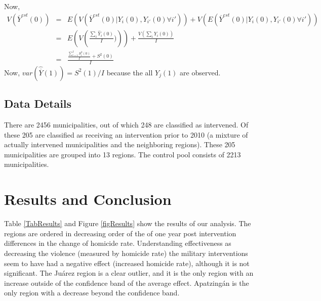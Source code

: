 \documentclass{article}[11 pt]
\begin{document}


Now, \begin{eqnarray*}
  V(\overline{Y}^{est}(0))&=&E(V(\overline{Y}^{est}(0)|Y_i(0),Y_{i'}(0) \forall i'))+ 			V(E(\overline{Y}^{est}(0)|Y_i(0),Y_{i'}(0)\forall i'))\\
  &=&E\left(V\left(\frac{\sum_i \hat{Y}_i(0)}{I})\right)\right)+\frac{V(\sum_iY_i(0))}{I}\\
&=&\frac{\frac{\sum_{i=1}^I S^2_i(0)}{I}+S^2(0)}{I}
\end{eqnarray*}
Now, $var(\hat{\overline{Y}}(1)) = S^2(1)/I$ because the all $Y_j(1)$ are observed.	

\subsection{Data Details}
There are 2456 municipalities, out of which 248 are classified as intervened. Of these 205 are classified as receiving an intervention prior to 2010 (a mixture of actually intervened municipalities and the neighboring regions). These 205 municipalities are grouped into 13 regions. The control pool consists of 2213 municipalities. 
			
\section{Results and Conclusion}
Table \ref{TabResults} and Figure \ref{figResults} show the results of our analysis. The regions are ordered in decreasing order of the of one year post intervention differences in the change of homicide rate. Understanding effectiveness as decreasing the violence (measured by homicide rate) the military interventions seem to have had a negative effect (increased homicide rate), although it is not significant. The Ju\'{a}rez region is a clear outlier, and it is the only region with an increase outside of the confidence band of the average effect. Apatzing\'{a}n is the only region with a decrease beyond the confidence band.  
\end{document}
